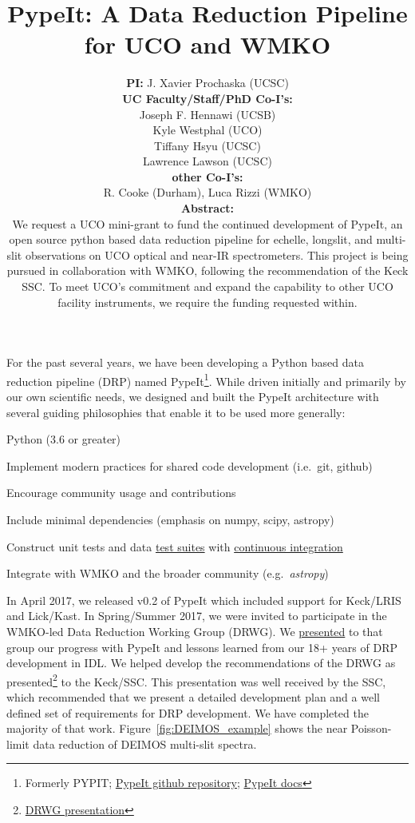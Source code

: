 \documentclass[12pt,preprint]{aastex}
\title{{\Large PypeIt:  A Data Reduction Pipeline for UCO and WMKO}}
\author{
{\bf PI:} 
J. Xavier Prochaska (UCSC) \\
\vskip 0.1in
{\bf UC Faculty/Staff/PhD Co-I's:} \\
Joseph F. Hennawi (UCSB) \\
Kyle Westphal (UCO) \\
Tiffany Hsyu (UCSC) \\
Lawrence Lawson (UCSC) \\
\vskip 0.1in
\vskip 0.1in
{\bf other Co-I's:} \\
R. Cooke (Durham), Luca Rizzi (WMKO) \\
\vskip 0.3in
{\bf Abstract:} \\
We request a UCO mini-grant to fund the continued development of PypeIt,
an open source python based data reduction pipeline for echelle, longslit, and multi-slit
observations on UCO optical and near-IR spectrometers.
This project is being pursued in collaboration with WMKO,
following the recommendation of the Keck SSC.
To meet UCO's commitment and expand the capability
to other UCO facility instruments, we require the
funding requested within.
}
\newenvironment{my_itemize}{
\begin{itemize}
  \setlength{\itemsep}{1pt}
  \setlength{\parskip}{0pt}
  \setlength{\parsep}{0pt}}{\end{itemize}
}
\begin{document}
\maketitle

	\pagestyle{myheadings}    %




 For the past several years, we have been developing a Python
based data reduction pipeline (DRP) named PypeIt\footnote{
Formerly PYPIT;
\href{https://github.com/pypeit/PypeIt}{PypeIt github repository};
\href{http://pypeit.readthedocs.io/en/latest/}{PypeIt docs}}.
While driven initially and primarily by our own scientific
needs, we designed and built the PypeIt architecture
with several guiding philosophies that enable it to be used more generally:

\vskip -0.2in

\begin{my_itemize}
\item Python (3.6 or greater)
\item Implement modern practices for shared code development 
(i.e.\ git, github)
\item Encourage community usage and contributions
\item Include minimal dependencies (emphasis on numpy, scipy, astropy)
\item Construct unit tests and data
\href{https://github.com/pypeit/PypeIt-development-suite}{test suites}
with 
\href{https://travis-ci.org/PypeIt/PypeIt/}{continuous integration}
\item Integrate with WMKO and the broader community (e.g.\ {\it astropy})
\end{my_itemize}

\vskip -0.1in

\noindent
In April 2017, we released v0.2 of PypeIt which included 
support for Keck/LRIS and Lick/Kast. 
In Spring/Summer 2017, we were invited to participate
in the WMKO-led Data Reduction Working Group (DRWG). We 
\href{https://www.dropbox.com/s/n17il1aah1xs6fx/ucsc_PypeIt_mar2017.pdf?dl=0}
{presented} to that group our progress with PypeIt and
lessons learned from our 18+ years of DRP development in 
IDL. %
We helped develop the recommendations of the DRWG as 
presented\footnote{\href{https://www.dropbox.com/s/k7ykp80voslaw7o/DRWG_June2017_SSC_v2.pptx?dl=0}{DRWG presentation}} 
to the Keck/SSC.  This presentation was well received by the
SSC, which recommended that we present a detailed development plan and a well defined set of requirements for DRP development.  
We have completed the majority of that work.
Figure~\ref{fig:DEIMOS_example} shows
the near Poisson-limit data reduction of DEIMOS
multi-slit spectra.
\end{document}
